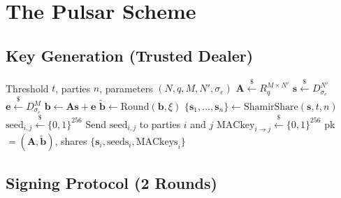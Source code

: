 \section{The Pulsar Scheme}

\label{sec:scheme}

\subsection{Key Generation (Trusted Dealer)}

\begin{algorithm}[H]
\caption{Pulsar Key Generation}
\label{alg:keygen}
\begin{algorithmic}[1]
\Require Threshold $t$, parties $n$, parameters $(N, q, M, N', \sigma_e)$
\State $\mathbf{A} \stackrel{\$}{\leftarrow} R_q^{M \times N'}$ 
\State $\mathbf{s} \stackrel{\$}{\leftarrow} D_{\sigma_e}^{N'}$ 
\State $\mathbf{e} \stackrel{\$}{\leftarrow} D_{\sigma_e}^{M}$ 
\State $\mathbf{b} \gets \mathbf{A}\mathbf{s} + \mathbf{e}$ 
\State $\tilde{\mathbf{b}} \gets \text{Round}(\mathbf{b}, \xi)$ 
\State $\{\mathbf{s}_1, \ldots, \mathbf{s}_n\} \gets \text{ShamirShare}(\mathbf{s}, t, n)$ 
\State {}
    \State $\text{seed}_{i,j} \stackrel{\$}{\leftarrow} \{0,1\}^{256}$ 
    \State Send $\text{seed}_{i,j}$ to parties $i$ and $j$
\EndFor
\State {}
    \State $\text{MACkey}_{i \to j} \stackrel{\$}{\leftarrow} \{0,1\}^{256}$
\EndFor
\State \Return pk $= (\mathbf{A}, \tilde{\mathbf{b}})$, shares $\{\mathbf{s}_i, \text{seeds}_i, \text{MACkeys}_i\}$
\end{algorithmic}
\end{algorithm}

\subsection{Signing Protocol (2 Rounds)}

